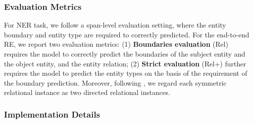\documentclass[11pt]{article}
\begin{document}
\subsubsection{Evaluation Metrics}


For NER task, we follow a span-level evaluation setting, where the entity boundary and entity type are required to correctly predicted.   For the end-to-end RE, we report two evaluation metrics: (1) \textbf{Boundaries evaluation} (Rel) requires the model to correctly predict the boundaries of the subject entity and the object entity, and the entity relation; (2) \textbf{Strict evaluation} (Rel+) further requires the model to predict 
the entity types on the basis of the requirement of the boundary prediction. Moreover, following \citet{UniRE}, we regard each symmetric relational instance as two directed relational instances.











\subsubsection{Implementation Details}


\begin{table}[!t]
\small
{}
 \caption{The statistics of the adopted datasets.}
 


 \label{tab:statistics}


\end{table}
\end{document}
